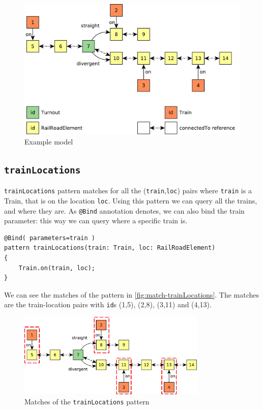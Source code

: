 \begin{figure}[H]
	\begin{center}
		\includegraphics[width=\textwidth]{figures/query-example-model.pdf}
		\caption{Example model}
		\label{fig:query-example-model}
	\end{center}
\end{figure}

\subsection{\texttt{trainLocations}}
\begin{minipage}{\textwidth}

\texttt{trainLocations} pattern matches for all the (\texttt{train},\texttt{loc}) pairs where \texttt{train} is a Train, that is on the location \texttt{loc}.
Using this pattern we can query all the trains, and where they are.
As \texttt{@Bind} annotation denotes, we can also bind the train parameter: this way we can query where a specific train is.
\begin{lstlisting}[language = vql]
@Bind( parameters=train )
pattern trainLocations(train: Train, loc: RailRoadElement)
{
	Train.on(train, loc);
}
\end{lstlisting}
We can see the matches of the pattern in \autoref{fig:match-trainLocations}. The matches are the train-location pairs with \texttt{id}s (1,5), (2,8), (3,11) and (4,13).
\begin{figure}[H]
	\begin{center}
		\includegraphics[width=0.8\textwidth]{figures/query-example-model-trainloc.pdf}
	\end{center}
	\caption{Matches of the \texttt{trainLocations} pattern}
	\label{fig:match-trainLocations}
\end{figure}

\end{minipage}


